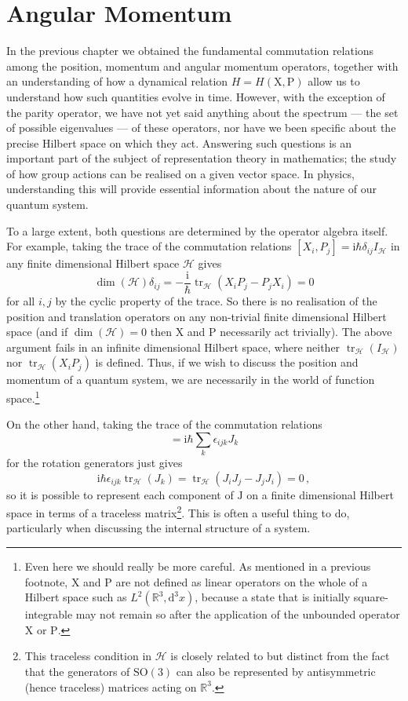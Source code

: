 \documentclass{article}
\theoremstyle{plain}\theoremheaderfont{\normalfont\itshape}\theorembodyfont{\rmfamily}\theoremseparator{.}\newtheorem*{rem}{Remark}\newtheorem*{ex}{Example}\newtheorem*{proof}{Proof}\newtheorem*{altp}{Alternative proof}
\theoremstyle{plain}\theoremheaderfont{\normalfont\bfseries}\theorembodyfont{\rmfamily}\theoremseparator{.}\newtheorem{thm}{Theorem}[section]\newtheorem{lem}[thm]{Lemma}\newtheorem{prop}[thm]{Proposition}\newtheorem*{cor}{Corollary}\newtheorem{defn}[thm]{Definition}\newtheorem{clm}[thm]{Claim}\newtheorem{clminproof}{Claim}
\theoremstyle{break}\theoremheaderfont{\normalfont\itshape}\theorembodyfont{\rmfamily}\theoremseparator{.\medskip}\newtheorem*{proofskip}{Proof}\newtheorem*{exs}{Examples}\newtheorem*{rems}{Remarks}
\theoremstyle{break}\theoremheaderfont{\normalfont\bfseries}\theorembodyfont{\rmfamily}\theoremseparator{.\medskip}\newtheorem{lemskip}[thm]{Lemma}\newtheorem{defnskip}[thm]{Definition}\newtheorem{propskip}[thm]{Proposition}\newtheorem{thmskip}[thm]{Theorem}
\numberwithin{equation}{section}
\newcommand{\ii}{\mathrm{i}}
\renewcommand{\d}[2][]{\mathrm{d}^{#1} #2}
\newcommand{\vb}[1]{\bm{\mathrm{#1}}}
\newcommand{\hb}{\mathcal{H}}
\DeclareMathOperator{\tr}{tr}
\newcommand{\RR}{\mathbb{R}}
\newcommand{\SO}{\mathrm{SO}}
\begin{document}
    \section{Angular Momentum}
    In the previous chapter we obtained the fundamental commutation relations among the position, momentum and angular momentum operators, together with an understanding of how a dynamical relation \(H=H(\vb{X},\vb{P})\) allow us to understand how such quantities evolve in time. However, with the exception of the parity operator, we have not yet said anything about the spectrum --- the set of possible eigenvalues --- of these operators, nor have we been specific about the precise Hilbert space on which they act. Answering such questions is an important part of the subject of representation theory in mathematics; the study of how group actions can be realised on a given vector space. In physics, understanding this will provide essential information about the nature of our quantum system.

    To a large extent, both questions are determined by the operator algebra itself. For example, taking the trace of the commutation relations \([X_i,P_j]=\ii\hbar \delta_{ij}I_{\hb}\) in any finite dimensional Hilbert space \(\hb\) gives
    \begin{equation}
        \dim(\hb)\delta_{ij}=-\frac{\ii}{\hbar}\tr_{\hb}(X_i P_j-P_j X_i)=0
    \end{equation}
    for all \(i,j\) by the cyclic property of the trace. So there is no realisation of the position and translation operators on any non-trivial finite dimensional Hilbert space (and if \(\dim(\hb)=0\) then \(\vb{X}\) and \(\vb{P}\) necessarily act trivially). The above argument fails in an infinite dimensional Hilbert space, where neither \(\tr_{\hb}(I_\hb)\) nor \(\tr_\hb (X_i P_j)\) is defined. Thus, if we wish to discuss the position and momentum of a quantum system, we are necessarily in the world of function space.\footnote{Even here we should really be more careful. As mentioned in a previous footnote, \(\vb{X}\) and \(\vb{P}\) are not defined as linear operators on the whole of a Hilbert space such as \(L^2(\RR^3,\d[3]{x})\), because a state that is initially square-integrable may not remain so after the application of the unbounded operator \(\vb{X}\) or \(\vb{P}\).}

    On the other hand, taking the trace of the commutation relations
    \begin{equation}
        [J_i,J_j]=\ii\hbar\sum_k\epsilon_{ijk}J_k
    \end{equation}
    for the rotation generators just gives
    \begin{equation}
        \ii\hbar\epsilon_{ijk}\tr_{\hb}(J_k)=\tr_{\hb}(J_iJ_j-J_jJ_i)=0\,,
    \end{equation}
    so it is possible to represent each component of \(\vb{J}\) on a finite dimensional Hilbert space in terms of a traceless matrix\footnote{This traceless condition in \(\hb\) is closely related to but distinct from the fact that the generators of \(\SO(3)\) can also be represented by antisymmetric (hence traceless) matrices acting on \(\RR^3\).}. This is often a useful thing to do, particularly when discussing the internal structure of a system.
\end{document}
